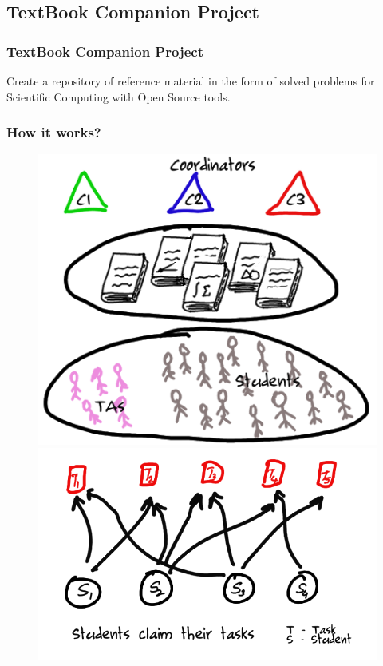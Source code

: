 \documentclass[compress,red]{beamer} %
\begin{document}
\subsection{TextBook Companion Project}

\begin{frame}
\frametitle{TextBook Companion Project}
\begin{definition}
Create a repository of reference material in the form of solved problems for Scientific Computing with Open Source tools.
\end{definition}
\end{frame}

\begin{frame}
\frametitle{How it works?}
\begin{figure}[ht]
\begin{minipage}[b]{0.5\linewidth}
\centering
\includegraphics[scale=0.15]{1.png}
\end{minipage}
\hspace{0.5cm}
\begin{minipage}[b]{0.5\linewidth}
\centering
\includegraphics[scale=0.15]{2.png}

\end{minipage}
\end{figure}
\end{frame}
\end{document}
